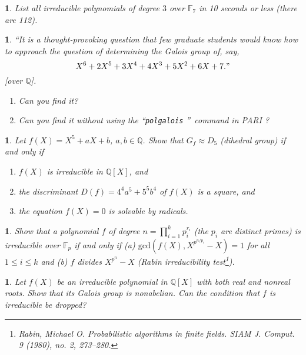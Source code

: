 \documentclass[a4paper,11pt,final,openany]{memoir}
\newtheorem{exercise}[Y]{}
\theoremstyle{nonumberplain}
\begin{document}
\begin{exercise}
\label{x18} List all irreducible polynomials of degree $3 $ over
$\mathbb{F}_{7}$ in 10 seconds or less (there are 112).
\end{exercise}

\begin{exercise}
\label{x19} ``It is a thought-provoking question that few graduate students
would know how to approach the question of determining the Galois group of,
say,
\[
X^{6}+2X^{5}+3X^{4}+4X^{3}+5X^{2}+6X+7.\text{\textrm{''}}%
\]
[over ${\mathbb{Q}}$].

\begin{enumerate}
\item Can you find it?

\item Can you find it without using the \textquotedblleft\texttt{polgalois}%
\textquotedblright\ command in PARI%
%
?
\end{enumerate}
\end{exercise}

\begin{exercise}
\label{x20} Let $f(X)=X^{5}+aX+b$, $a,b\in{\mathbb{Q}}$. Show that
$G_{f}\approx D_{5}$ (dihedral group) if and only if

\begin{enumerate}
\item $f(X)$ is irreducible in ${\mathbb{Q}}[X]$, and

\item the discriminant $D(f)=4^{4}a^{5}+5^{5}b^{4}$ of $f(X)$ is a square, and

\item the equation $f(X)=0$ is solvable by radicals.
\end{enumerate}
\end{exercise}

\begin{exercise}
\label{x20a} Show that a polynomial $f$ of degree $n=\prod_{i=1}^{k}%
p_{i}^{r_{i}}$ (the $p_{i}$ are distinct primes) is irreducible over
$\mathbb{F}_{p}$ if and only if (a) $\mathrm{gcd}(f(X),X^{p^{n/p_{i}}}-X)=1$
for all $1\leq i\leq k$ and (b) $f$ divides $X^{p^{n}}-X$ (Rabin
irreducibility test\footnote{Rabin, Michael O. Probabilistic algorithms in
finite fields. SIAM J. Comput. 9 (1980), no. 2, 273--280.}).
\end{exercise}

\begin{exercise}
\label{x20b}Let $f(X)$ be an irreducible polynomial in $\mathbb{Q}{}[X]$ with
both real and nonreal roots. Show that its Galois group is nonabelian. Can the
condition that $f$ is irreducible be dropped?
\end{exercise}
\end{document}
